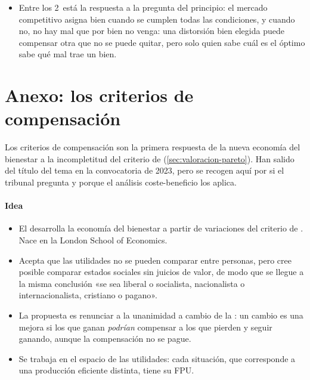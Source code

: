 \documentclass[11pt]{article}
\begin{document}
\begin{itemize}
\begin{itemize}
  \item Entre los 2~está la respuesta a la pregunta del principio: el mercado competitivo asigna bien cuando se cumplen todas las condiciones, y cuando no, no hay mal que por bien no venga: una distorsión bien elegida puede compensar otra que no se puede quitar, pero solo quien sabe cuál es el óptimo sabe qué mal trae un bien.
  \end{itemize}
\end{itemize}

\clearpage
\appendix

\section{Anexo: los criterios de compensación}\label{anexo:compensacion}

Los criterios de compensación son la primera respuesta de la nueva economía del bienestar a la incompletitud del criterio de  (\ref{sec:valoracion-pareto}). Han salido del título del tema en la convocatoria de 2023, pero se recogen aquí por si el tribunal pregunta y porque el análisis coste-beneficio los aplica.

\paragraph{Idea}

\begin{itemize}
\item El  desarrolla la economía del bienestar a partir de variaciones del criterio de . Nace en la London School of Economics.
\item Acepta que las utilidades no se pueden comparar entre personas, pero cree posible comparar estados sociales sin juicios de valor, de modo que se llegue a la misma conclusión «se sea liberal o socialista, nacionalista o internacionalista, cristiano o pagano»\nocite{Hicks1939Foundations,HETParetoSocial}.
\item La propuesta es renunciar a la unanimidad a cambio de la : un cambio es una mejora si los que ganan \emph{podrían} compensar a los que pierden y seguir ganando, aunque la compensación no se pague.
\item Se trabaja en el espacio de las utilidades: cada situación, que corresponde a una producción eficiente distinta, tiene su FPU.
\end{itemize}
\end{document}
